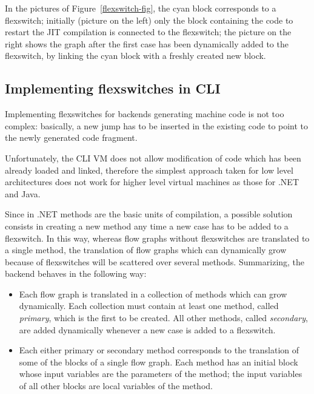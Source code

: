 In the pictures of Figure~\ref{flexswitch-fig}, the cyan block
corresponds to a flexswitch; initially (picture on the left) 
only the block containing the code to restart the JIT compilation
is connected to the flexswitch; the picture on the right
shows the graph after the first case has been dynamically added to the flexswitch,
by linking the cyan block with a freshly created new block.


\subsection{Implementing flexswitches in CLI}

Implementing flexswitches for backends generating machine code is
not too complex: basically, a new jump has to be inserted in the
existing code to point to the newly generated code fragment.

Unfortunately, the CLI VM does not allow modification of code which
has been already loaded and linked, therefore the simplest approach
taken for low level architectures does not work for higher level 
virtual machines as those for .NET and Java.

Since in .NET methods are the basic units of compilation, a possible
solution consists in creating a new method 
any time a new case has to be added to a flexswitch.
In this way, whereas flow graphs without flexswitches are translated
to a single method, the translation of flow graphs which can dynamically grow because of
flexswitches will be scattered over several methods.
Summarizing, the backend behaves in the following way:
\begin{itemize}
\item Each flow graph is translated in a collection of methods which
  can grow dynamically.  Each collection must contain at least one
  method, called \emph{primary}, which is the first to be created.
  All other methods, called \emph{secondary}, are added dynamically 
  whenever a new case is added to a flexswitch.

\item Each either primary or secondary method corresponds to the
  translation of some of the blocks of a single flow graph. Each
  method has an initial block whose input variables are the
  parameters of the method; the input variables of all other blocks
  are local variables of the method.
\end{itemize} 

